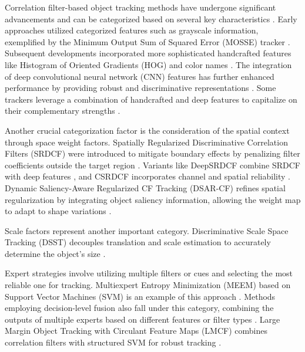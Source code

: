 Correlation filter-based object tracking methods have undergone significant advancements and can be categorized based on several key characteristics \cite{du2021overview}. Early approaches utilized categorized features such as grayscale information, exemplified by the Minimum Output Sum of Squared Error (MOSSE) tracker \cite{feng2019dynamic, zhao2020correlation, lin2024motion}. Subsequent developments incorporated more sophisticated handcrafted features like Histogram of Oriented Gradients (HOG) and color names \cite{elmezain2025advancing, zhang2024webuot, feng2019dynamic, lin2024motion}. The integration of deep convolutional neural network (CNN) features has further enhanced performance by providing robust and discriminative representations \cite{feng2019dynamic, du2021overview, lin2024motion}. Some trackers leverage a combination of handcrafted and deep features to capitalize on their complementary strengths \cite{zhang2024webuot, du2021overview, lin2024motion}.

Another crucial categorization factor is the consideration of the spatial context through space weight factors. Spatially Regularized Discriminative Correlation Filters (SRDCF) were introduced to mitigate boundary effects by penalizing filter coefficients outside the target region \cite{du2021overview, feng2019dynamic, lin2024motion}. Variants like DeepSRDCF combine SRDCF with deep features \cite{feng2019dynamic, du2021overview}, and CSRDCF incorporates channel and spatial reliability \cite{feng2019dynamic, du2021overview, zhao2020correlation}. Dynamic Saliency-Aware Regularized CF Tracking (DSAR-CF) refines spatial regularization by integrating object saliency information, allowing the weight map to adapt to shape variations \cite{feng2019dynamic, du2021overview, lin2024motion}.

Scale factors represent another important category. Discriminative Scale Space Tracking (DSST) decouples translation and scale estimation to accurately determine the object's size \cite{zhang2024webuot, feng2019dynamic, lin2024motion}.

Expert strategies involve utilizing multiple filters or cues and selecting the most reliable one for tracking. Multiexpert Entropy Minimization (MEEM) based on Support Vector Machines (SVM) is an example of this approach \cite{du2021overview, srigowri2022enhancing}. Methods employing decision-level fusion also fall under this category, combining the outputs of multiple experts based on different features or filter types \cite{lin2024motion, elmezain2025advancing}. Large Margin Object Tracking with Circulant Feature Maps (LMCF) combines correlation filters with structured SVM for robust tracking \cite{feng2019dynamic, du2021overview}.


